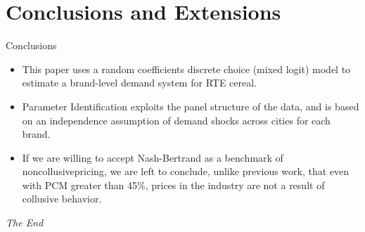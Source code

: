 \documentclass{beamer}
\begin{document}
\section{Conclusions and Extensions}
\begin{frame}
	\transfade
	\tableofcontents[sectionstyle=show/shaded,subsectionstyle=show/shaded/hide]
	\addtocounter{framenumber}{-1}
\end{frame}
\begin{frame}{Conclusions}
	\begin{itemize}
		\item This paper uses a random coefficients discrete choice (mixed logit) model to estimate a brand-level demand system for RTE cereal.
		\item Parameter Identification exploits the panel structure of the data, and is based on an independence assumption of demand shocks across cities for each brand.
		\item If we are willing to accept Nash-Bertrand as a benchmark of noncollusivepricing, we are left to conclude, unlike previous work, that even with PCM greater than 45\%, prices in the industry are not a result of collusive behavior.
	\end{itemize}
\end{frame}



\begin{frame}
\Huge{\centerline{\textit{The End}}}
\end{frame}
\end{document}
